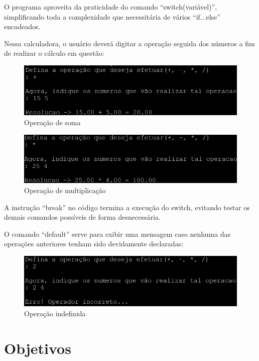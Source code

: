 \documentclass[a4paper,10pt]{article}  %
\begin{document}
   O programa aproveita da praticidade do comando “switch(variável)”, simplificando toda a complexidade que necessitária de vários “if...else” encadeados. \par
 Nessa calculadora, o usuário deverá digitar a operação seguida dos números a fim de realizar o cálculo em questão: 
 
 \begin{figure}[H]
 \centering
 \includegraphics[width=.80\linewidth]{imagens/ex5.png}
 \caption{Operação de soma}
 \end{figure}

 \begin{figure}[H]
 \centering
 \includegraphics[width=.80\linewidth]{imagens/ex6.png}
 \caption{Operação de multiplicação}
\end{figure}

     A instrução “break” no código termina a execução do switch, evitando testar os demais comandos possíveis de forma desnecessária. \par
   
     O comando “default” serve para exibir uma mensagem caso nenhuma das operações anteriores tenham sido devidamente declaradas:


 \begin{figure}[H]
 \centering
 \includegraphics[width=.80\linewidth]{imagens/ex7.png}
 \caption{Operação indefinida}
\end{figure}


\section{Objetivos}
\end{document}

